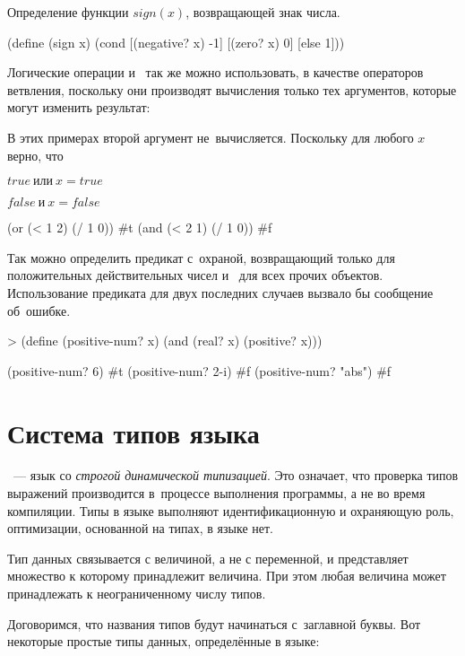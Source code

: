 \begin{example}{Определение функции $sign(x)$, возвращающей знак числа.}
\begin{ExampleCode}
(define (sign x)
  (cond
    [(negative? x) -1]
    [(zero? x) 0]
    [else 1]))
\end{ExampleCode}
\end{example}

Логические операции  и~ так же можно использовать, в качестве операторов ветвления, поскольку они производят вычисления только тех аргументов, которые могут изменить результат:

\begin{example}{%
В этих примерах второй аргумент не~вычисляется. Поскольку для любого $x$ верно, что

$true\ \text{или}\ x = true$

$false\ \text{и}\ x = false$}
\REPL
  {(or (< 1 2) (/ 1 0))}
  {\#t}
\REPL
  {(and (< 2 1) (/ 1 0))}
  {\#f}
\end{example}

\begin{example}{Так можно определить предикат с~охраной, возвращающий  только для положительных действительных чисел и~ для всех прочих объектов. Использование предиката  для двух последних случаев вызвало бы сообщение об~ошибке.}
\begin{ExampleCode}
> (define (positive-num? x)
    (and (real? x)
         (positive? x)))
\end{ExampleCode}
\REPL
  {(positive-num? 6)}
  {\#t}
\REPL
  {(positive-num? 2-i)}
  {\#f}
\REPL
  {(positive-num? "abs")}
  {\#f}
\end{example}

\section{Система типов языка \Scheme}%
\Scheme~--- язык со \emph{строгой динамической типизацией}. Это означает, что проверка типов выражений производится в~процессе выполнения программы, а не во время компиляции. Типы в языке выполняют идентификационную и охраняющую роль, оптимизации, основанной на типах, в языке нет.

Тип данных связывается с величиной, а не с переменной, и представляет множество к которому принадлежит величина. При этом любая величина может принадлежать к неограниченному числу типов.

Договоримся, что названия типов будут начинаться с~заглавной буквы. Вот некоторые простые типы данных, определённые в языке:

